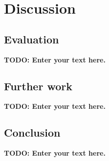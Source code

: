 \documentclass[draft,final]{vutinfth} %
\newcommand{\todo}[1]{{\color{red}\textbf{TODO: {#1}}}} %
\begin{document}
\chapter{Discussion}
\label{discussion-chapter}

\section{Evaluation}
\todo{Enter your text here.}

\section{Further work}
\todo{Enter your text here.}

\section{Conclusion}

\todo{Enter your text here.}

\backmatter

\listoffigures %

\listoftables %

\listofalgorithms
{}

\printindex

\printglossaries



\end{document}
